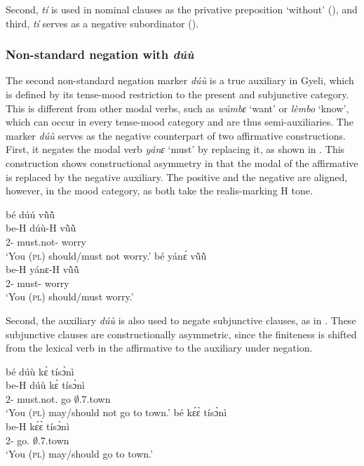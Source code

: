 \documentclass[output=paper,colorlinks=true, citecolor=brown,draftmode]{langscibook}
\begin{document}
Second, {\itshape tí} is used in nominal clauses as the privative preposition `without' (), and third, {\itshape tí} serves as a negative  subordinator (). 

\subsubsection{Non-standard negation with {\itshape dúù}}
\label{sec:gye:duu}

The second non-standard negation marker {\itshape dúù} is a true auxiliary in Gyeli, which is defined by its tense-mood restriction to the present and subjunctive category. This is different from other modal verbs, such as {\itshape wúmbɛ} `want' or {\itshape lèmbo} `know', which can occur in every tense-mood category and are thus semi-auxiliaries. The marker {\itshape dúù} serves as the negative counterpart of two affirmative constructions.  First, it negates the modal verb {\itshape yánɛ} `must' by replacing it, as shown in . This construction shows constructional asymmetry in that the modal of the affirmative is replaced by the negative auxiliary. The positive and the negative are aligned, however, in the mood category, as both take the realis-marking H tone. 

\ea\label{duu1}
\ea\label{duu1a}
  \glll bé dúú vũ̀ũ̀\\
      be-H dúù-H vũ̀ũ̀ \\
        2{\PL}-{\PRS} must.not-{\R} worry \\
    \trans `You (\textsc{pl}) should/must not worry.'
\ex\label{duu1b}
  \glll bé yánɛ́ vũ̀ũ̀ \\
      be-H yánɛ-H vũ̀ũ̀ \\
        2{\PL}-{\PRS} must-{\R} worry \\
    \trans `You (\textsc{pl}) should/must worry.'
\z
\z

Second, the auxiliary {\itshape dúù}  is also  used to negate subjunctive clauses, as in . These subjunctive clauses are constructionally asymmetric, since the finiteness is shifted from the lexical verb in the affirmative to the auxiliary under negation. 

\ea\label{duu2}
\ea\label{duu2a}
  \glll bé dúù kɛ̀ tísɔ̀nì \\
      be-H dúù kɛ̀ tísɔ̀nì \\
        2{\PL}-{\PRS} must.not.{\SBJV} go $\emptyset$.7.town \\
    \trans `You (\textsc{pl}) may/should not go to town.'
\ex\label{duu2b}
  \glll bé kɛ́ɛ̀ tísɔ̀nì \\
      be-H kɛ́ɛ̀ tísɔ̀nì \\
        2{\PL}-{\PRS} go.{\SBJV} $\emptyset$.7.town \\
    \trans `You (\textsc{pl}) may/should go to town.'
\z
\z
\end{document}
